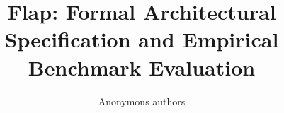\title{\textbf{Flap: Formal Architectural Specification and Empirical Benchmark Evaluation}}

\author{Anonymous authors}
